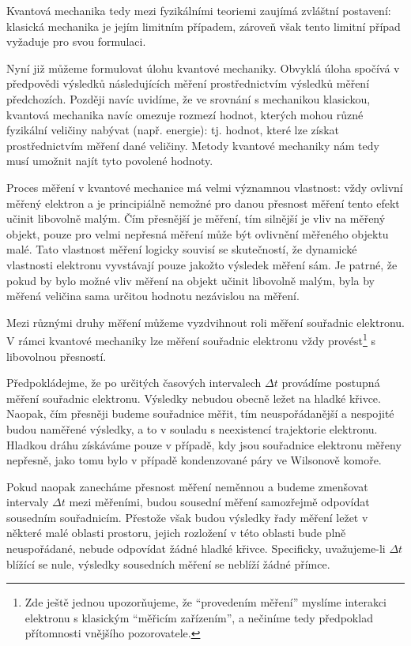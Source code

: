 Kvantová mechanika tedy mezi fyzikálními teoriemi zaujímá zvláštní postavení: klasická mechanika je jejím limitním případem, zároveň však tento limitní případ vyžaduje pro svou formulaci.\par
Nyní již můžeme formulovat úlohu kvantové mechaniky. Obvyklá úloha spočívá v předpovědi výsledků následujících měření prostřednictvím výsledků měření předchozích. Později navíc uvidíme, že ve srovnání s mechanikou klasickou, kvantová mechanika navíc omezuje rozmezí hodnot, kterých mohou různé fyzikální veličiny nabývat (např. energie): tj. hodnot, které lze získat prostřednictvím měření dané veličiny. Metody kvantové mechaniky nám tedy musí umožnit najít tyto povolené hodnoty.\par
Proces měření v kvantové mechanice má velmi významnou vlastnost: vždy ovlivní měřený elektron a je principiálně nemožné pro danou přesnost měření tento efekt učinit libovolně malým. Čím přesnější je měření, tím silnější je vliv na měřený objekt, pouze pro velmi nepřesná měření může být ovlivnění měřeného objektu malé. Tato vlastnost měření logicky souvisí se skutečností, že dynamické vlastnosti elektronu vyvstávají pouze jakožto výsledek měření sám. Je patrné, že pokud by bylo možné vliv měření na objekt učinit libovolně malým, byla by měřená veličina sama určitou hodnotu nezávislou na měření.\par
Mezi různými druhy měření můžeme vyzdvihnout roli měření souřadnic elektronu. V rámci kvantové mechaniky lze měření souřadnic elektronu vždy provést\footnote{Zde ještě jednou upozorňujeme, že ``provedením měření'' myslíme interakci elektronu s klasickým ``měřicím zařízením'', a nečiníme tedy předpoklad přítomnosti vnějšího pozorovatele.} s libovolnou přesností.\par
Předpokládejme, že po určitých časových intervalech \(\Delta t\) provádíme postupná měření souřadnic elektronu. Výsledky nebudou obecně ležet na hladké křivce. Naopak, čím přesněji budeme souřadnice měřit, tím neuspořádanější a nespojité budou naměřené výsledky, a to v souladu s neexistencí trajektorie elektronu. Hladkou dráhu získáváme pouze v případě, kdy jsou souřadnice elektronu měřeny nepřesně, jako tomu bylo v případě kondenzované páry ve Wilsonově komoře.\par
Pokud naopak zanecháme přesnost měření neměnnou a budeme zmenšovat intervaly \(\Delta t\) mezi měřeními, budou sousední měření samozřejmě odpovídat sousedním souřadnicím. Přestože však budou výsledky řady měření ležet v některé malé oblasti prostoru, jejich rozložení v této oblasti bude plně neuspořádané, nebude odpovídat žádné hladké křivce. Specificky, uvažujeme-li \(\Delta t\) blížící se nule, výsledky sousedních měření se neblíží žádné přímce.\par
